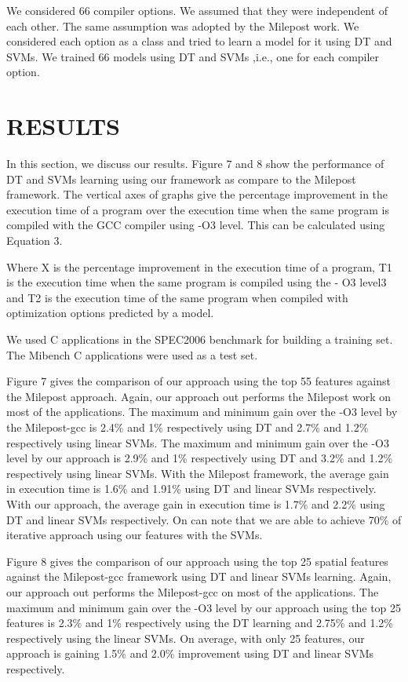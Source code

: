\documentclass[conference]{IEEEtran}
\begin{document}
We considered 66 compiler options. We assumed that they were independent of each other. The same assumption was adopted by the Milepost work. We considered each option as a class and tried to learn a model for it using DT and SVMs. We trained 66 models using DT and SVMs ,i.e., one
for each compiler option.

\section{RESULTS}


In this section, we discuss our results. Figure 7 and 8 show the performance of DT and SVMs learning using our framework as compare to the Milepost framework. The vertical axes of graphs give the percentage improvement in the execution time of a program over the execution time
when the same program is compiled with the GCC compiler using -O3 level. This can be calculated using Equation 3.


Where X is the percentage improvement in the execution time of a program, T1 is the execution time when the same program is compiled using the - O3 level3 and T2 is the execution time of the same program when compiled with optimization options predicted by a model.


We used C applications in the SPEC2006 benchmark for building a training set. The Mibench C applications were used as a test set.

Figure 7 gives the comparison of our approach using the top 55 features against the Milepost approach. Again, our approach out performs the Milepost work on most of the applications. The maximum and minimum gain over the -O3 level by the Milepost-gcc is 2.4\% and 1\% respectively using DT and 2.7\% and 1.2\% respectively using linear SVMs. The maximum and minimum gain over the -O3 level by our approach is 2.9\% and 1\% respectively using DT and 3.2\% and 1.2\% respectively using linear SVMs. With the Milepost framework, the average gain in execution time is 1.6\% and 1.91\% using DT and linear SVMs respectively. With our approach, the average gain in execution time is 1.7\% and 2.2\% using DT and linear SVMs respectively. On can note that we are able to achieve 70\% of iterative approach using our features with the SVMs.


Figure 8 gives the comparison of our approach using the top 25 spatial features against the Milepost-gcc framework using DT and linear SVMs learning. Again, our approach out performs the Milepost-gcc on most of the applications. The maximum and minimum gain over the -O3 level by our approach using the top 25 features is 2.3\% and 1\% respectively using the DT learning and 2.75\% and 1.2\% respectively using the linear SVMs. On average, with only 25 features, our approach is gaining 1.5\% and 2.0\% improvement using DT and linear SVMs respectively.
\end{document}
